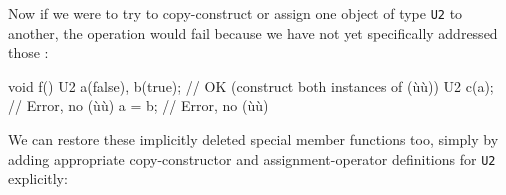 \noindent Now if we were to try to copy-construct or assign one object of type
\lstinline!U2! to another, the operation would fail because we have not
yet specifically addressed those :

\begin{emcppslisting}[emcppsbatch=e2]
void f()
{
    U2 a(false), b(true);  // OK (construct both instances of (ù{}ù))
    U2 c(a);               // Error, no (ù{}ù)
    a = b;                 // Error, no (ù{}ù)
}
\end{emcppslisting}

\noindent We can restore these implicitly deleted special member functions too,
simply by adding appropriate copy-constructor and assignment-operator
definitions for \lstinline!U2! explicitly:

